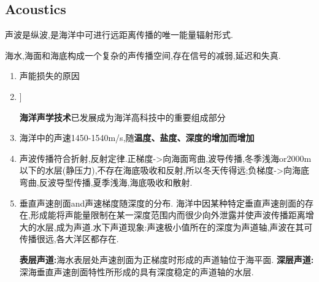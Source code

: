 	\subsection{Acoustics}
		声波是纵波,是海洋中可进行远距离传播的唯一能量辐射形式.
		
		海水,海面和海底构成一个复杂的声传播空间,存在信号的减弱,延迟和失真.
		
		\begin{enumerate}
			\item 声能损失的原因
			
			\item \begin{forest}
					[sonar
						[driving]
						[passive]
						]
				  \end{forest}
			  \textbf{海洋声学技术}已发展成为海洋高科技中的重要组成部分
			  
			\item 海洋中的声速1450-1540m/s,随\textbf{温度、盐度、深度的增加而增加}
			\item 声波传播符合折射,反射定律.正梯度->向海面弯曲,波导传播,冬季浅海or2000m以下的水层(静压力),不存在海底吸收和反射,所以冬天传得远;负梯度->向海底弯曲,反波导型传播,夏季浅海,海底吸收和散射.
			\item 垂直声速剖面and声速梯度随深度的分布.
				海洋中因某种特定垂直声速剖面的存在,形成能将声能量限制在某一深度范围内而很少向外泄露并使声波传播距离增大的水层,成为声道.水下声道现象:声速极小值所在的深度为声道轴,声波在其可传播很远,各大洋区都存在.
				
				\textbf{表层声道:}海水表层处声速剖面为正梯度时形成的声道轴位于海平面.
				\textbf{深层声道:}深海垂直声速剖面特性所形成的具有深度稳定的声道轴的水层.
		\end{enumerate}
		